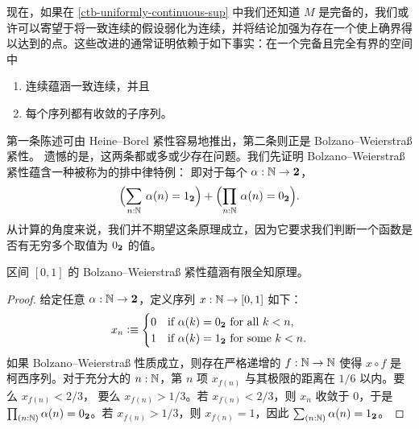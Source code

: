 现在，如果在 \cref{ctb-uniformly-continuous-sup} 中我们还知道 $M$ 是完备的，我们或许可以寄望于将一致连续的假设弱化为连续，并将结论加强为存在一个使上确界得以达到的点。这些改进的通常证明依赖于如下事实：在一个完备且完全有界的空间中
%


\begin{enumerate}
\item 连续蕴涵一致连续，并且
\item 每个序列都有收敛的子序列。
\end{enumerate}


%
第一条陈述可由 Heine--Borel 紧性容易地推出，第二条则正是 Bolzano--Weierstra\ss{} 紧性。
%
遗憾的是，这两条都或多或少存在问题。我们先证明 Bolzano--Weierstra\ss{} 紧性蕴含一种被称为的排中律特例：
%
%
即对于每个 $\alpha : \mathbb{N} \to \mathbf{2}$，
%
\begin{equation} \label{eq:lpo}
  \Parens{\sm{n : \N} \alpha(n) = \btrue} +
  \Parens{\prd{n : \N} \alpha(n) = \bfalse}.
\end{equation}
%
从计算的角度来说，我们并不期望这条原理成立，因为它要求我们判断一个函数是否有无穷多个取值为 ${0_{\mathbf{2}}}$ 的值。

\begin{thm} \label{analysis-bw-lpo}
  区间 $[0,1]$ 的 Bolzano--Weierstra\ss{} 紧性蕴涵有限全知原理。
\end{thm}

\begin{proof}
  给定任意 $\alpha : \mathbb{N} \to \mathbf{2}$，定义序列 $x : \mathbb{N} \to [0,1]$ 如下：
  \begin{equation*}
    x_n \vcentcolon\equiv
    \begin{cases}
      0 & \text{if $\alpha(k) = {0_{\mathbf{2}}}$ for all $k < n$,}\\
      1 & \text{if $\alpha(k) = {1_{\mathbf{2}}}$ for some $k < n$}.
    \end{cases}
  \end{equation*}
  如果 Bolzano--Weierstra\ss{} 性质成立，则存在严格递增的 $f : \mathbb{N} \to
  \mathbb{N}$ 使得 $x \circ f$ 是柯西序列。对于充分大的 $n:
  \mathbb{N}$，第 $n$ 项 $x_{f(n)}$ 与其极限的距离在 $1/6$ 以内。要么 $x_{f(n)} < 2/3$，
  要么 $x_{f(n)} > 1/3$。若 $x_{f(n)} < 2/3$，则 $x_n$ 收敛于 $0$，于是 $\prd{n : \N}
  \alpha(n) = \bfalse$。若 $x_{f(n)} > 1/3$，则 $x_{f(n)} = 1$，因此 $\sm{n : \N}
  \alpha(n) = \btrue$。
\end{proof}

